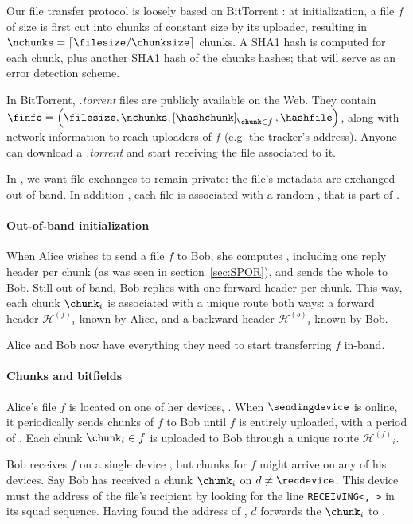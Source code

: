 Our file transfer protocol is loosely based on BitTorrent \cite{bt_bep3}: 
at initialization, a file $f$ of size \filesize is first cut into chunks of constant size \chunksize by its uploader,
resulting in $\nchunks = \lceil \filesize / \chunksize \rceil$ chunks.
A SHA1 hash \hashchunk is computed for each chunk, plus another SHA1 hash \hashfile of the chunks hashes; that will serve as an error detection scheme. 

In BitTorrent, \textit{.torrent} files are publicly available on the Web.
They contain $\finfo = \left(\filesize, \nchunks, \left[\hashchunk\right]_{\chunk \in f}, \hashfile\right)$, 
along with network information to reach uploaders of $f$ (e.g. the tracker's address).
Anyone can download a \textit{.torrent} and start receiving the file associated to it.

In \name, we want file exchanges to remain private: the file's metadata are exchanged out-of-band.
In addition , each file is associated with a random \fileid, that is part of \finfo.

\newcommand\forwardheader{\ensuremath{\mathcal{H}^{(f)}}}
\newcommand\backwardheader{\ensuremath{\mathcal{H}^{(b)}}}

\paragraph*{Out-of-band initialization} 
When Alice wishes to send a file $f$ to Bob, she computes \finfo, 
including one reply header per chunk (as was seen in section~\ref{sec:SPOR}), and sends the whole to Bob.
Still out-of-band, Bob replies with one forward header per chunk.
This way, each chunk $\chunk_i$ is associated with a unique route both ways: 
a forward header $\forwardheader_i$ known by Alice, and a backward header $\backwardheader_i$ known by Bob.

Alice and Bob now have everything they need to start transferring $f$ in-band.


\paragraph*{Chunks and bitfields}
Alice's file $f$ is located on one of her devices, \sendingdevice. 
When $\sendingdevice$ is online, it periodically sends chunks of $f$ to Bob until $f$ is entirely uploaded, with a period of \tupload.
Each chunk $\chunk_i \in f$ is uploaded to Bob through a unique route $\forwardheader_i$.

Bob receives $f$ on a single device \recdevice, but chunks for $f$ might arrive on any of his devices.
Say Bob has received a chunk $\chunk_i$ on $d \neq \recdevice$.
This device must the address of the file's recipient \recdevice by looking for the line \texttt{RECEIVING<\recdevice, \fileid>} in its squad sequence.
Having found the address of \recdevice, $d$ forwards the $\chunk_i$ to \recdevice.

